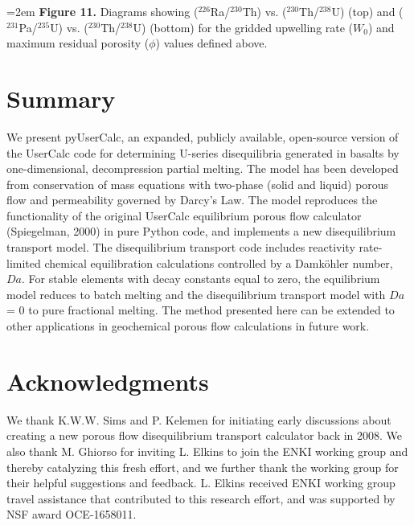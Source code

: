\documentclass[11pt]{article}
\begin{document}
    \begin{center}
    \end{center}
    
\hangindent=2em
    \textbf{Figure 11.} Diagrams showing ($^{226}$Ra/$^{230}$Th) vs. ($^{230}$Th/$^{238}$U) (top) and ($^{231}$Pa/$^{235}$U) vs. ($^{230}$Th/$^{238}$U) (bottom) for the gridded upwelling rate ($W_0$) and maximum residual porosity ($\phi$) values defined above.

\bigskip

    \hypertarget{summary}{%
\section{Summary}\label{summary}}

We present pyUserCalc, an expanded, publicly available, open-source version of the UserCalc code for determining U-series disequilibria generated in basalts by one-dimensional, decompression partial melting. The model has been developed from conservation of mass equations with two-phase (solid and liquid) porous flow and permeability governed by Darcy's Law. The model reproduces the functionality of the original UserCalc equilibrium porous flow calculator (Spiegelman, 2000) in pure Python code, and implements a new disequilibrium transport model. The disequilibrium transport code includes reactivity rate-limited chemical equilibration calculations controlled by a Damköhler number, $Da$. For stable elements with decay constants equal to zero, the equilibrium model reduces to batch melting and the disequilibrium transport model with $Da$ = 0 to pure fractional melting. The method presented here can be extended to other applications in geochemical porous flow calculations in future work.

    \hypertarget{acknowledgments}{%
\section*{Acknowledgments}\label{acknowledgments}}

We thank K.W.W. Sims and P. Kelemen for initiating early discussions about creating a new porous flow disequilibrium transport calculator back in 2008. We also thank M. Ghiorso for inviting L. Elkins to join the ENKI working group and thereby catalyzing this fresh effort, and we further thank the working group for their helpful suggestions and feedback. L. Elkins received ENKI working group travel assistance that contributed to this research effort, and was supported by NSF award OCE-1658011.
\end{document}
